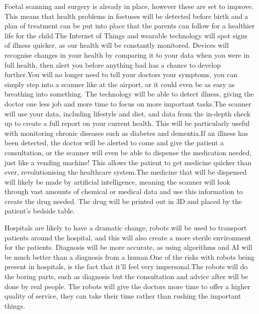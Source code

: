 \documentclass[12pt]{article}
\begin{document}
Foetal scanning and surgery is already in place, however these are set to improve. This means that health problems in foetuses will be detected before birth and a plan of treatment can be put into place that the parents can follow for a healthier life for the child.The Internet of Things and wearable technology will spot signs of illness quicker, as our health will be constantly monitored. Devices will recognise changes in your health by comparing it to your data when you were in full health, then alert you before anything bad has a chance to develop further.You will no longer need to tell your doctors your symptoms, you can simply step into a scanner like at the airport, or it could even be as easy as breathing into something. The technology will be able to detect illness, giving the doctor one less job and more time to focus on more important tasks.The scanner will use your data, including lifestyle and diet, and data from the in-depth check up to create a full report on your current health. This will be particularly useful with monitoring chronic diseases such as diabetes and dementia.If an illness has been detected, the doctor will be alerted to come and give the patient a consultation, or the scanner will even be able to dispense the medication needed, just like a vending machine! This allows the patient to get medicine quicker than ever, revolutionising the healthcare system.The medicine that will be dispensed will likely be made by artificial intelligence, meaning the scanner will look through vast amounts of chemical or medical data and use this information to create the drug needed. The drug will be printed out in 3D and placed by the patient’s bedside table.

\indent

Hospitals are likely to have a dramatic change, robots will be used to transport patients around the hospital, and this will also create a more sterile environment for the patients. Diagnosis will be more accurate, as using algorithms and AI will be much better than a diagnosis from a human.One of the risks with robots being present in hospitals, is the fact that it’ll feel very impersonal.The robots will do the boring parts, such as diagnosis but the consultation and advice after will be done by real people. The robots will give the doctors more time to offer a higher quality of service, they can take their time rather than rushing the important things.

 
 
\end{document}
